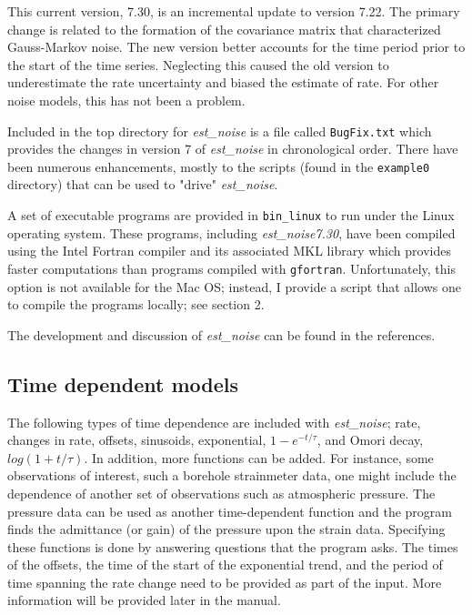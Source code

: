 \documentclass[12pt]{amsart}
\begin{document}
This current version, 7.30, is an incremental update to version 7.22.  The primary change is related to the formation of the
covariance matrix that characterized Gauss-Markov noise. The new version better accounts for the time period prior to the start
of the time series. Neglecting this caused the old version to underestimate the rate uncertainty and biased the estimate of rate.
For other noise models, this has not been a problem.

Included in the top directory for \textit{est\_noise} is a file called \texttt{BugFix.txt} which provides the changes in version 7 of  \textit{est\_noise} in
chronological order.  There have been numerous enhancements, mostly to the scripts (found in the \texttt{example0} directory)
that can be used to "drive" \textit{est\_noise}.

A set of executable programs are provided in \texttt{bin\_linux} to run under the Linux operating system. These programs, including
\textit{est\_noise7.30}, have been compiled using the Intel Fortran compiler and its associated MKL library which provides faster
computations than programs compiled with \texttt{gfortran}.  Unfortunately, this option is not available for the Mac OS; instead, I provide
a script that allows one to compile the programs locally; see section 2.

The development and discussion of \textit{est\_noise} can be found in the references. 

\subsection{Time dependent models}

The following types of time dependence are included with \textit{est\_noise};  rate, changes in rate, offsets, sinusoids,
exponential, $1-e^{-t/{\tau}}$, and Omori decay, $log(1 + t/{\tau})$. In addition, more functions can be added.  For instance,
some observations of interest, such a borehole strainmeter data, one might include the dependence of another set of observations such as atmospheric pressure. The pressure data can be used as another time-dependent function and the
program finds the admittance (or gain) of the pressure upon the strain data. Specifying these functions is done by answering
questions that the program asks. The times of the offsets, the time of the start of the exponential trend,
and the period of time spanning the rate change need to be provided as part of the input.  
More information will be provided later in the manual.
\end{document}

